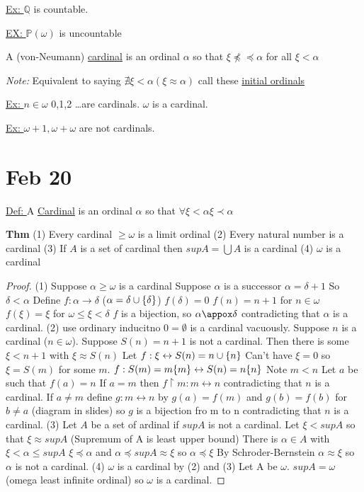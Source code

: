 \underline{Ex: } $\mathbb{Q}$ is countable.

\underline{EX: } $\mathbb{P}(\omega)$ is uncountable

 A (von-Neumann) \underline{cardinal} is an ordinal $\alpha$ so that $\xi \npreceq \preceq \alpha$ for all $\xi < \alpha$

\emph{Note: } Equivalent to saying $\nexists \xi < \alpha (\xi \approx \alpha)$
call these \underline{initial ordinals}

\underline{Ex: } $n \in \omega$ 0,1,2 \dots are cardinals.
$\omega$ is a cardinal.

\underline{Ex: } $\omega + 1, \omega + \omega$ are not cardinals.


\section{Feb 20}

\underline{Def: } A \underline{Cardinal} is an ordinal $\alpha$ so that $\forall \xi < \alpha \xi \prec \alpha$

\textbf{Thm}
(1) Every cardinal $\geq \omega$ is a limit ordinal
(2) Every natural number is a cardinal
(3) If $A$ is a set of cardinal then $supA = \bigcup A$ is a cardinal
(4) $\omega$ is a cardinal

\begin{proof}
(1) Suppose $\alpha \geq \omega$ is a cardinal
    Suppose $\alpha$ is a successor $\alpha = \delta + 1$
    So $\delta < \alpha$
    Define $f: \alpha \rightarrow \delta$ ($\alpha = \delta \cup \{\delta\}$)
    $f(\delta) = 0$
    $f(n) = n+1$ for $n \in \omega$
    $f(\xi) = \xi$ for $\omega \leq \xi < \delta$
    $f$ is a bijection, so $\alpha \appox \delta$ contradicting that $\alpha$ is a cardinal.
(2) use ordinary inducitno
    $0 = \emptyset$ is a cardinal vacuously.
    Suppose $n$ is a cardinal ($n \in \omega$).
    Suppose $S(n)=n+1$ is not a cardinal.
    Then there is some $\xi < n+1$ with $\xi \approx S(n)$
    Let $f : \xi \leftrightarrow S(n) = n \cup \{n\}$
    Can't have $\xi = 0$ so $\xi=S(m)$ for some $m$.
    $f : S(m) =m \{m\} \leftrightarrow S(n) = n \{n\}$
    Note $m < n$
    Let $a$ be such that $f(a) = n$
    If $a=m$ then $f \upharpoonright m : m \leftrightarrow n$ contradicting that $n$ is a cardinal.
    If $a \neq m$ define $g : m \leftrightarrow n$ by $g(a) = f(m)$ and $g(b) = f(b)$ for $b \neq a$
(diagram in slides)
    so $g$ is a bijection fro m to n contradicting that $n$ is a cardinal.
(3) Let $A$ be a set of  ardinal if $sup A$ is not a cardinal.
    Let $\xi < sup A$ so that $\xi \approx sup A$ (Supremum of A is least upper bound)
    There is $\alpha \in A$ with $\xi < \alpha \leq sup A$
    $\xi \preceq \alpha$ and $\alpha \preceq sup A \approx \xi$ so $\alpha \preceq \xi$
    By Schroder-Bernstein $\alpha \approx \xi$ so $\alpha$ is not a cardinal.
(4) $\omega$ is a cardinal by (2) and (3)
    Let A be $\omega$.
    $sup A = \omega$ (omega least infinite ordinal)
    so $\omega$ is a cardinal.
\end{proof}


